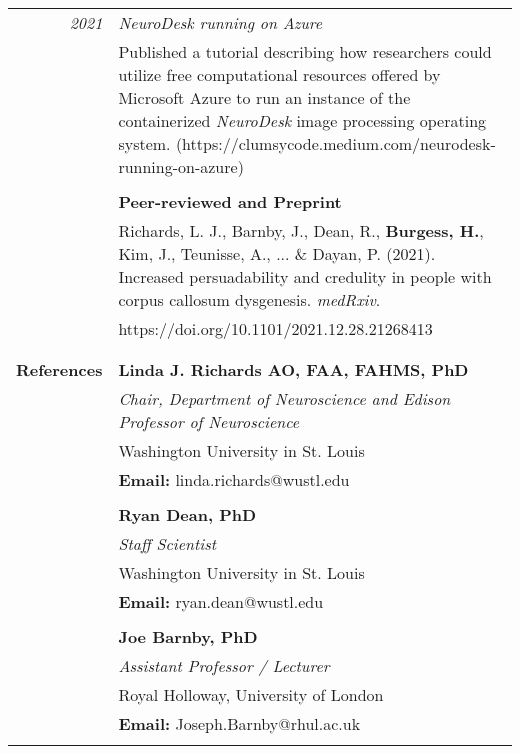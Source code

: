 \documentclass{article}
\begin{document}
\begin{longtable}{>{\columncolor{LeftColumn}}r | p{13cm}}
		\large\textit{2021}					& \large\textit{NeuroDesk running on Azure}	\\	
											& Published a tutorial describing how researchers could utilize free computational resources offered by Microsoft Azure to run an instance of the containerized \textit{NeuroDesk} image processing operating system. (https://clumsycode.medium.com/neurodesk-running-on-azure) \\
											& \\
											
											& \large\textbf{Peer-reviewed and Preprint} \\
											& Richards, L. J., Barnby, J., Dean, R., \textbf{Burgess, H.}, Kim, J., Teunisse, A., ... \& Dayan, P. (2021). Increased persuadability and credulity in people with corpus callosum dysgenesis. \textit{medRxiv}. \\
											& https://doi.org/10.1101/2021.12.28.21268413 \\
											& \\
											\hline

											\pagebreak

											\hline \\
		\large\textbf{References} 	  		& \large\textbf{Linda J. Richards AO, FAA, FAHMS, PhD} \\
											& \textit{Chair, Department of Neuroscience and Edison Professor of Neuroscience} \\
											& Washington University in St. Louis \\
											& \textbf{Email:} linda.richards@wustl.edu \\
											& \\

											& \large\textbf{Ryan Dean, PhD} \\
											& \textit{Staff Scientist} \\
											& Washington University in St. Louis \\
											& \textbf{Email:} ryan.dean@wustl.edu \\
											& \\

											& \large\textbf{Joe Barnby, PhD} \\
											& \textit{Assistant Professor / Lecturer} \\
											& Royal Holloway, University of London \\
											& \textbf{Email:} Joseph.Barnby@rhul.ac.uk \\
											& \\
											\hline
	\end{longtable}
\end{document}
